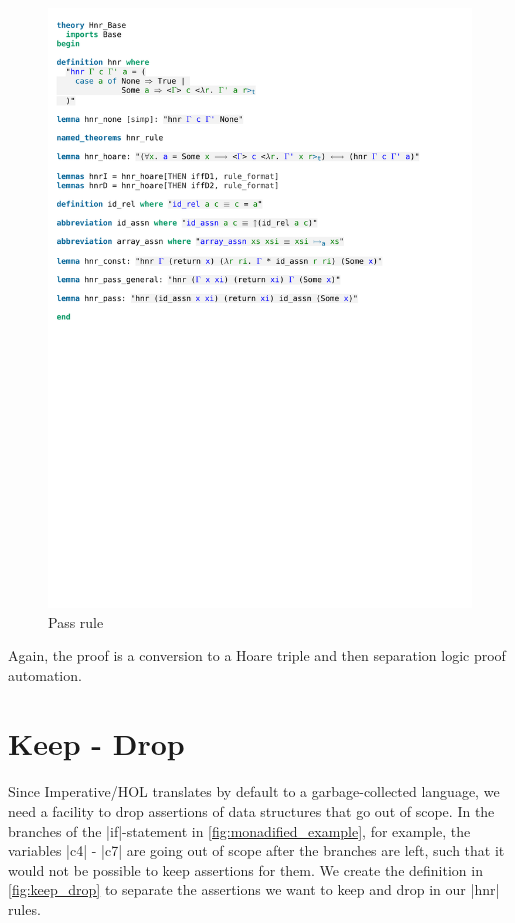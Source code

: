 \begin{figure}[htpb]
    \includegraphics[trim={0 15cm 0 13,2cm}, clip, width=1.00\textwidth]{figures/Theory_Hnr_Base.pdf}
    \caption[Pass rule]{Pass rule}
    \label{fig:hnr_pass}
\end{figure}

\noindent Again, the proof is a conversion to a Hoare triple and then separation logic proof automation.

\section{Keep - Drop}\label{section:keep_drop}

Since Imperative/HOL translates by default to a garbage-collected language, we need a facility to drop assertions of data structures that go out of scope. In the branches of the |if|-statement in \autoref{fig:monadified_example}, for example, the variables |c4| - |c7| are going out of scope after the branches are left, such that it would not be possible to keep assertions for them. 
We create the definition in \autoref{fig:keep_drop} to separate the assertions we want to keep and drop in our |hnr| rules.

